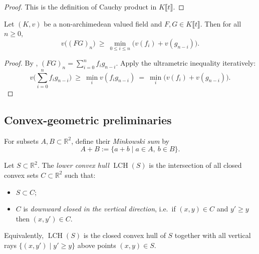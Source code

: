 \begin{proof}
  \leanok
  This is the definition of Cauchy product in $K\llbracket t\rrbracket$.
\end{proof}

\begin{lemma}
  \label{lem:vp_coeff_mul_lower_bound}
  \leanok
  Let $(K,v)$ be a non-archimedean valued field and $F,G\in K\llbracket t\rrbracket$.
  Then for all $n\ge 0$,
  \[
    v\big((FG)_n\big)\ \ge\ \min_{0\le i\le n}\big(v(f_i)+v(g_{n-i})\big).
  \]
\end{lemma}

\begin{proof}
  \leanok
  By , $(FG)_n=\sum_{i=0}^n f_i g_{n-i}$.
  Apply the ultrametric inequality iteratively:
  \[
    v\Big(\sum_{i=0}^n f_i g_{n-i}\Big)\ \ge\ \min_i v(f_i g_{n-i})
    \ =\ \min_i \big(v(f_i)+v(g_{n-i})\big).
  \]
\end{proof}

\subsection{Convex-geometric preliminaries}

\begin{definition}
  \label{def:minkowski_sum}
  \leanok
  \uses{}
  For subsets $A,B\subset \mathbb{R}^2$, define their \emph{Minkowski sum} by
  \[
    A+B := \{a+b \mid a\in A,\ b\in B\}.
  \]
\end{definition}

\begin{definition}
  \label{def:lower_convex_hull}
  \leanok
  \uses{}
  Let $S\subset \mathbb{R}^2$.
  The \emph{lower convex hull} $\operatorname{LCH}(S)$ is the intersection of all closed convex sets
  $C\subset\mathbb{R}^2$ such that:
  \begin{itemize}
    \item $S\subset C$;
    \item $C$ is \emph{downward closed in the vertical direction}, i.e.\ if $(x,y)\in C$ and $y'\ge y$ then $(x,y')\in C$.
  \end{itemize}
  Equivalently, $\operatorname{LCH}(S)$ is the closed convex hull of $S$ together with all vertical rays
  $\{(x,y')\mid y'\ge y\}$ above points $(x,y)\in S$.
\end{definition}

